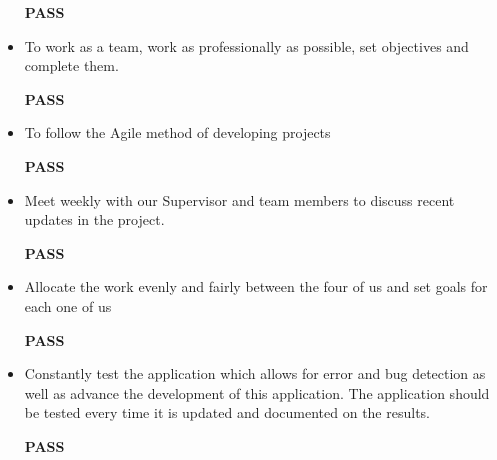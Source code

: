 \begin{itemize}
  \begin{center}
      \textbf{PASS}
  \end{center}
  \item To work as a team, work as professionally as possible, set objectives and complete them.
  \begin{center}
      \textbf{PASS}
  \end{center}
  \item To follow the Agile method of developing projects 
  \begin{center}
      \textbf{PASS}
  \end{center}
  \item Meet weekly with our Supervisor and team members to discuss recent updates in the project.
  \begin{center}
      \textbf{PASS}
  \end{center}
  \item Allocate the work evenly and fairly between the four of us and set goals for each one of us
  \begin{center}
      \textbf{PASS}
  \end{center}
  \item Constantly test the application which allows for error and bug detection
as well as advance the development of this application. The application should be tested every time it is updated and documented on the results.
  \begin{center}
      \textbf{PASS}
  \end{center}
\end{itemize}

